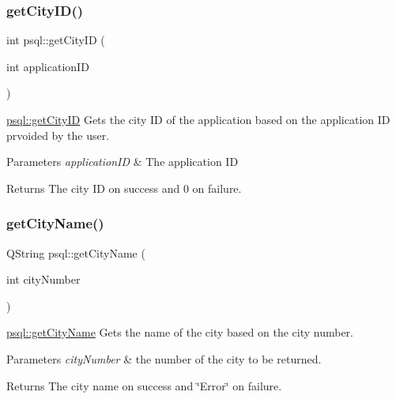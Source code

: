 \subsubsection{\texorpdfstring{get\+City\+I\+D()}{getCityID()}}
{\footnotesize\ttfamily int psql\+::get\+City\+ID (\begin{DoxyParamCaption}\item[{int}]{application\+ID }\end{DoxyParamCaption})}



\hyperlink{classpsql_af3462a12dc106e0ca8df4fa8fcf28436}{psql\+::get\+City\+ID} Gets the city ID of the application based on the application ID prvoided by the user. 


\begin{DoxyParams}{Parameters}
{\em application\+ID} & The application ID \\
\hline
\end{DoxyParams}
\begin{DoxyReturn}{Returns}
The city ID on success and 0 on failure. 
\end{DoxyReturn}
\mbox{\label{classpsql_a7acc18034ef60c8a1e69b0e1a15d8ab2}} 
\subsubsection{\texorpdfstring{get\+City\+Name()}{getCityName()}}
{\footnotesize\ttfamily Q\+String psql\+::get\+City\+Name (\begin{DoxyParamCaption}\item[{int}]{city\+Number }\end{DoxyParamCaption})}



\hyperlink{classpsql_a7acc18034ef60c8a1e69b0e1a15d8ab2}{psql\+::get\+City\+Name} Gets the name of the city based on the city number. 


\begin{DoxyParams}{Parameters}
{\em city\+Number} & the number of the city to be returned. \\
\hline
\end{DoxyParams}
\begin{DoxyReturn}{Returns}
The city name on success and \char`\"{}\+Error\char`\"{} on failure. 
\end{DoxyReturn}
\mbox{\label{classpsql_a09745cd03f09ffb2dacacaab4281915f}} 
